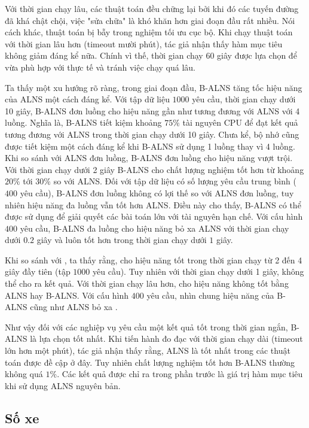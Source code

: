 Với thời gian chạy lâu, các thuật toán đều chững lại bởi khi đó các tuyến đường đã khá chật chội, việc "sửa chữa" là khó khăn hơn giai đoạn đầu rất nhiều. Nói cách khác, thuật toán bị bẫy trong nghiệm tối ưu cục bộ. Khi chạy thuật toán với thời gian lâu hơn (timeout mười phút), tác giả nhận thấy hàm mục tiêu không giảm đáng kể nữa. Chính vì thế, thời gian chạy 60 giây được lựa chọn để vừa phù hợp với thực tế và tránh việc chạy quá lâu.

Ta thấy một xu hướng rõ ràng, trong giai đoạn đầu, B-ALNS tăng tốc hiệu năng của ALNS một cách đáng kể. Với tập dữ liệu $1000$ yêu cầu, thời gian chạy dưới 10 giây, B-ALNS đơn luồng cho hiệu năng gần như tương đương với ALNS với 4 luồng. Nghĩa là, B-ALNS tiết kiệm khoảng $75\%$ tài nguyên CPU để đạt kết quả tương đương với ALNS trong thời gian chạy dưới 10 giây. Chưa kể, bộ nhớ cũng được tiết kiệm một cách đáng kể khi B-ALNS sử dụng 1 luồng thay vì 4 luồng. Khi so sánh với ALNS đơn luồng, B-ALNS đơn luồng cho hiệu năng vượt trội. Với thời gian chạy dưới 2 giây B-ALNS cho chất lượng nghiệm tốt hơn từ khoảng $20\%$ tới $30\%$ so với ALNS. Đối với tập dữ liệu có số lượng yêu cầu trung bình ($400$ yêu cầu), B-ALNS đơn luồng không có lợi thế so với ALNS đơn luồng, tuy nhiên hiệu năng đa luồng vẫn tốt hơn ALNS. Điều này cho thấy, B-ALNS có thể được sử dụng để giải quyết các bài toán lớn với tài nguyên hạn chế. Với cấu hình $400$ yêu cầu, B-ALNS đa luồng cho hiệu năng bỏ xa ALNS với thời gian chạy dưới $0.2$ giây và luôn tốt hơn trong thời gian chạy dưới $1$ giây.

Khi so sánh với , ta thấy rằng,  cho hiệu năng tốt trong thời gian chạy từ 2 đến 4 giây đầy tiên (tập $1000$ yêu cầu). Tuy nhiên với thời gian chạy dưới 1 giây,  không thể cho ra kết quả. Với thời gian chạy lâu hơn,  cho hiệu năng không tốt bằng ALNS hay B-ALNS. Với cấu hình $400$ yêu cầu, nhìn chung hiệu năng của B-ALNS cũng như ALNS bỏ xa .

Như vậy đối với các nghiệp vụ yêu cầu một kết quả tốt trong thời gian ngắn, B-ALNS là lựa chọn tốt nhất. Khi tiến hành đo đạc với thời gian chạy dài (timeout lớn hơn một phút), tác giả nhận thấy rằng, ALNS là tốt nhất trong các thuật toán được đề cập ở đây. Tuy nhiên chất lượng nghiệm tốt hơn B-ALNS thường không quá $1\%$. Các kết quả được chỉ ra trong phần trước là giá trị hàm mục tiêu khi sử dụng ALNS nguyên bản.

\subsection{Số xe}

